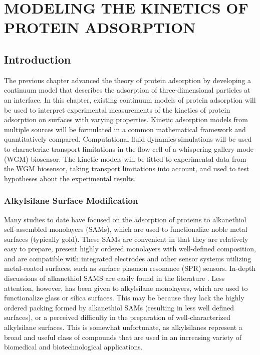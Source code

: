 
\chapter{\texorpdfstring{MODELING THE KINETICS OF PROTEIN ADSORPTION}{CHAPTER . MODELING THE KINETICS OF PROTEIN ADSORPTION}}


\section{Introduction}

The previous chapter advanced the theory of protein adsorption by
developing a continuum model that describes the adsorption of three-dimensional
particles at an interface. In this chapter, existing continuum models
of protein adsorption will be used to interpret experimental measurements
of the kinetics of protein adsorption on surfaces with varying properties.
Kinetic adsorption models from multiple sources will be formulated
in a common mathematical framework and quantitatively compared. Computational
fluid dynamics simulations will be used to characterize transport
limitations in the flow cell of a whispering gallery mode (WGM) biosensor.
The kinetic models will be fitted to experimental data from the WGM
biosensor, taking transport limitations into account, and used to
test hypotheses about the experimental results.


\subsection{Alkylsilane Surface Modification}

Many studies to date have focused on the adsorption of proteins to
alkanethiol self-assembled monolayers (SAMs), which are used to functionalize
noble metal surfaces (typically gold). These SAMs are convenient in
that they are relatively easy to prepare, present highly ordered monolayers
with well-defined composition, and are compatible with integrated
electrodes and other sensor systems utilizing metal-coated surfaces,
such as surface plasmon resonance (SPR) sensors. In-depth discussions
of alkanethiol SAMS are easily found in the literature \cite{Love2005}.
Less attention, however, has been given to alkylsilane monolayers,
which are used to functionalize glass or silica surfaces. This may
be because they lack the highly ordered packing formed by alkanethiol
SAMs (resulting in less well defined surfaces), or a perceived difficulty
in the preparation of well-characterized alkylsilane surfaces. This
is somewhat unfortunate, as alkylsilanes represent a broad and useful
class of compounds that are used in an increasing variety of biomedical
and biotechnological applications. 

